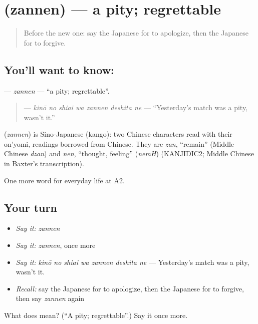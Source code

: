 \section[\texorpdfstring{\ja{ざんねん} (zannen)}{ざんねん (zannen)}]{ (zannen) — a pity; regrettable}

\label{lesson:JA-C246-zannen}



\begin{quote}
Before the new one: say the Japanese for to apologize, then the Japanese for to forgive.
\end{quote}

\subsection*{You'll want to know: }
\textbf{} — \emph{zannen} — \textquotedblleft{}a pity; regrettable\textquotedblright{}.

\begin{quote}
\textbf{  } — \emph{kinō no shiai wa zannen deshita ne} — \textquotedblleft{}Yesterday's match was a pity, wasn't it.\textquotedblright{}
\end{quote}

\begin{cousinweb}
\textbf{} (\emph{zannen}) is Sino-Japanese (kango): two Chinese characters read with their on'yomi, readings borrowed from Chinese. They are \emph{zan}, \textquotedblleft{}remain\textquotedblright{} (Middle Chinese \emph{dzan}) and \emph{nen}, \textquotedblleft{}thought, feeling\textquotedblright{} (\emph{nemH}) (KANJIDIC2; Middle Chinese in Baxter's transcription).
\end{cousinweb}

\begin{grammarlens}[title={What you've built}]
One more word for everyday life at A2.
\end{grammarlens}

\subsection*{Your turn}
\begin{itemize}
\raggedright
  \item \emph{Say it:} \emph{zannen}
  \item \emph{Say it:} \emph{zannen}, once more
  \item \emph{Say it:} \emph{kinō no shiai wa zannen deshita ne} — Yesterday's match was a pity, wasn't it.
  \item \emph{Recall:} say the Japanese for to apologize, then the Japanese for to forgive, then say \emph{zannen} again
\end{itemize}

\begin{tcolorbox}[breakable,colback=teal!4,colframe=teal!35!black,title={Before you move on}]
What does  mean? (\textquotedblleft{}A pity; regrettable\textquotedblright{}.) Say it once more.
\end{tcolorbox}
